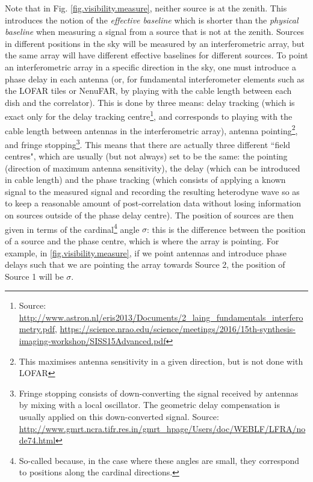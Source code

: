 \pg
Note that in Fig. \ref{fig.visibility.measure}, neither source is at the zenith. This introduces the notion of the \emph{effective baseline} which is shorter than the \emph{physical baseline} when measuring a signal from a source that is not at the zenith. Sources in different positions in the sky will be measured by an interferometric array, but the same array will have different effective baselines for different sources. To point an interferometric array in a specific direction in the sky, one must introduce a phase delay in each antenna (or, for fundamental interferometer elements such as the LOFAR tiles or NenuFAR, by playing with the cable length between each dish and the correlator). This is done by three means: delay tracking (which is exact only for the delay tracking centre\footnote{Source: \url{http://www.astron.nl/eris2013/Documents/2_laing_fundamentals_interferometry.pdf}, \url{https://science.nrao.edu/science/meetings/2016/15th-synthesis-imaging-workshop/SISS15Advanced.pdf}}, and corresponds to playing with the cable length between antennas in the interferometric array), antenna pointing\footnote{This maximises antenna sensitivity in a given direction, but is not done with LOFAR}, and fringe stopping\footnote{Fringe stopping consists of down-converting the signal received by antennas by mixing with a local oscillator. The geometric delay compensation is usually applied on this down-converted signal. Source: \url{http://www.gmrt.ncra.tifr.res.in/gmrt_hpage/Users/doc/WEBLF/LFRA/node74.html}}.
This means that there are actually three different ``field centres", which are usually (but not always) set to be the same: the pointing (direction of maximum antenna sensitivity), the delay (which can be introduced in cable length) and the phase tracking (which consists of applying a known signal to the measured signal and recording the resulting heterodyne wave so as to keep a reasonable amount of post-correlation data without losing information on sources outside of the phase delay centre). The position of sources are then given in terms of the cardinal\footnote{So-called because, in the case where these angles are small, they correspond to positions along the cardinal directions.} angle $\sigma$: this is the difference between the position of a source and the phase centre, which is where the array is pointing. For example, in \cref{fig.visibility.measure}, if we point antennas and introduce phase delays such that we are pointing the array towards Source 2, the position of Source 1 will be $\sigma$.


